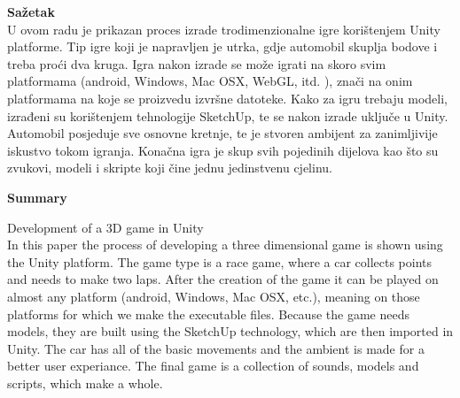 { \fontsize{16pt}{12pt}\selectfont\bfseries Sažetak}\\
U ovom radu je prikazan proces izrade trodimenzionalne igre korištenjem Unity platforme. Tip igre koji je napravljen je utrka, gdje automobil skuplja bodove i treba proći dva kruga. Igra nakon izrade se može igrati na skoro svim platformama (android, Windows, Mac OSX,  WebGL, itd. ), znači na onim platformama na koje se proizvedu izvršne datoteke.  Kako za igru trebaju modeli, izrađeni su korištenjem tehnologije SketchUp, te se nakon izrade uključe u Unity. Automobil posjeduje sve osnovne kretnje, te je stvoren ambijent za zanimljivije iskustvo tokom igranja. Konačna igra je skup svih pojedinih dijelova kao što su zvukovi, modeli i skripte koji čine jednu jedinstvenu cjelinu.\par
\vspace{2mm}
{ \fontsize{16pt}{14pt}\selectfont\bfseries Summary}\par
{ \fontsize{14pt}{12pt}\selectfont Development of a 3D game in Unity}\\
In this paper the process of developing a three dimensional game is shown using the Unity platform. The game type is a race game, where a car collects points and needs to make two laps. After the creation of the game it can be played on almost any platform (android, Windows, Mac OSX, etc.), meaning on those platforms for which we make the executable files. Because the game needs models, they are built using the SketchUp technology, which are then imported in Unity. The car has all of the basic movements and the ambient is made for a better user experiance. The final game is a collection of sounds, models and scripts, which make a whole.
